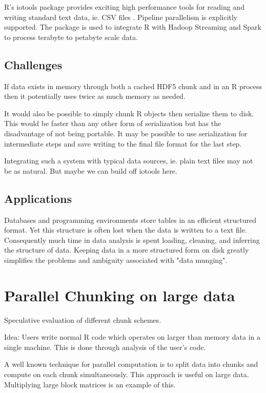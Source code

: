 \documentclass[12pt]{article}
\begin{document}
R's iotools package provides exciting high performance tools for reading
and writing standard text data, ie. CSV files \cite{arnold2015iotools}.
Pipeline parallelism is explicitly supported. The package is used to
integrate R with Hadoop Streaming and Spark to process terabyte to petabyte
scale data.

\subsection{Challenges}

If data exists in memory through both a cached HDF5 chunk and in an R process
then it potentially uses twice as much memory as needed.

It would also be possible to simply chunk R objects then serialize 
them to disk. This would be faster than any other form of serialization but
has the disadvantage of not being portable. It may be possible to use 
serialization for intermediate steps and save writing to the final file
format for the last step.

Integrating such a system with typical data sources, ie. plain text files may
not be as natural. But maybe we can build off iotools here.

\subsection{Applications}

Databases and programming environments store tables in an efficient
structured format. Yet this structure is often lost when the data is
written to a text file. Consequently much time in data analysis is
spent loading, cleaning, and inferring the structure of data. Keeping data
in a more structured form on disk greatly simplifies the problems and
ambiguity associated with "data munging".


\section{Parallel Chunking on large data}

Speculative evaluation of different chunk schemes.

Idea: Users write normal R code which operates on larger than
memory data in a single machine. This is done through analysis of the
user's code.

A well known technique for parallel computation is to split data into
chunks and compute on each chunk simultaneously. This approach 
is useful on large data. Multiplying large block matrices is an example of this.
\end{document}
